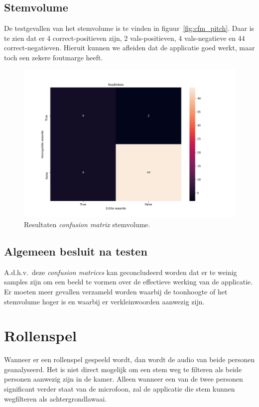 \subsection{Stemvolume}

De testgevallen van het stemvolume is te vinden in figuur~\ref{fig:cfm_pitch}. Daar is te zien dat er 4 correct-positieven zijn, 2 vals-positieven, 4 vals-negatieve en 44 correct-negatieven.
Hieruit kunnen we afleiden dat de applicatie goed werkt, maar toch een zekere foutmarge heeft.
\begin{figure}
	\centering
	\includegraphics[width=1\textwidth]{./img/cfm_loudness}
	\caption{\label{fig:cfm_loudness} Resultaten \textit{confusion matrix} stemvolume.}
\end{figure}

\subsection{Algemeen besluit na testen}
A.d.h.v.\ deze \textit{confusion matrices} kan geconcludeerd worden dat er te weinig samples zijn om een beeld te vormen over de effectieve werking van de applicatie. Er moeten meer gevallen verzameld worden waarbij de toonhoogte of het stemvolume hoger is en waarbij er verkleinwoorden aanwezig zijn.

\section{Rollenspel}
Wanneer er een rollenspel gespeeld wordt, dan wordt de audio van beide personen geanalyseerd. Het is niet direct mogelijk om een stem weg te filteren als beide personen aanwezig zijn in de kamer. Alleen wanneer een van de twee personen significant verder staat van de microfoon, zal de applicatie die stem kunnen wegfilteren als achtergrondlawaai.


